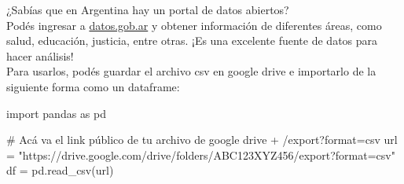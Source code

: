 \documentclass[
  letterpaper,
  DIV=11,
  numbers=noendperiod]{scrreprt}
\newenvironment{Shaded}{\begin{snugshade}}{\end{snugshade}}
\newcommand{\CommentTok}[1]{\textcolor[rgb]{0.37,0.37,0.37}{#1}}
\newcommand{\ImportTok}[1]{\textcolor[rgb]{0.00,0.46,0.62}{#1}}
\newcommand{\NormalTok}[1]{\textcolor[rgb]{0.00,0.23,0.31}{#1}}
\newcommand{\OperatorTok}[1]{\textcolor[rgb]{0.37,0.37,0.37}{#1}}
\newcommand{\StringTok}[1]{\textcolor[rgb]{0.13,0.47,0.30}{#1}}
\begin{document}
\begin{tcolorbox}[enhanced jigsaw, opacitybacktitle=0.6, toptitle=1mm, toprule=.15mm, arc=.35mm, breakable, bottomrule=.15mm, opacityback=0, leftrule=.75mm, rightrule=.15mm, title=\textcolor{quarto-callout-note-color}{\faInfo}\hspace{0.5em}{datos.gob.ar}, left=2mm, bottomtitle=1mm, colframe=quarto-callout-note-color-frame, colback=white, titlerule=0mm, coltitle=black, colbacktitle=quarto-callout-note-color!10!white]

¿Sabías que en Argentina hay un portal de datos abiertos?\\
Podés ingresar a \href{https://www.datos.gob.ar/dataset}{datos.gob.ar} y
obtener información de diferentes áreas, como salud, educación,
justicia, entre otras. ¡Es una excelente fuente de datos para hacer
análisis!\\
Para usarlos, podés guardar el archivo csv en google drive e importarlo
de la siguiente forma como un dataframe:

\begin{Shaded}
\begin{Highlighting}[]
\ImportTok{import}\NormalTok{ pandas }\ImportTok{as}\NormalTok{ pd}

\CommentTok{\# Acá va el link público de tu archivo de google drive + \textquotesingle{}/export?format=csv\textquotesingle{}}
\NormalTok{url }\OperatorTok{=} \StringTok{"https://drive.google.com/drive/folders/ABC123XYZ456/export?format=csv"} 
\NormalTok{df }\OperatorTok{=}\NormalTok{ pd.read\_csv(url)}
\end{Highlighting}
\end{Shaded}

\end{tcolorbox}
\end{document}
